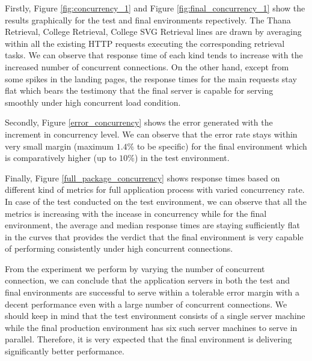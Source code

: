 \documentclass[sigconf,authordraft]{acmart}
\begin{document}
Firstly, Figure \ref{fig:concurrency_1} and Figure \ref{fig:final_concurrency_1} show the results graphically for the test and final environments repectively. The Thana Retrieval, College Retrieval, College SVG Retrieval lines are drawn by averaging within all the existing HTTP requests executing the corresponding retrieval tasks. We can observe that response time of each kind tends to increase with the increased number of concurrent connections. 
On the other hand, except from some spikes in the landing pages, the response times for the main requests stay flat which bears the testimony that the final server is capable for serving smoothly under high concurrent load condition.

Secondly, Figure \ref{error_concurrency} shows the error generated with the increment in concurrency level. We can observe that the error rate stays within very small margin (maximum $1.4\%$ to be specific) for the final environment which is comparatively higher (up to $10\%$) in the test environment.

Finally, Figure \ref{full_package_concurrency} shows response times based on different kind of metrics for full application process with varied concurrency rate. In case of the test conducted on the test environment, we can observe that all the metrics is increasing with the incease in concurrency while for the final environment, the average and median response times are staying sufficiently flat in the curves that provides the verdict that the final environment is very capable of performing consistently under high concurrent connections.   

From the experiment we perform by varying the number of concurrent connection, we can conclude that the application servers in both the test and final environments are successful to serve within a tolerable error margin with a decent performance even with a large number of concurrent connections. We should keep in mind that the test environment consists of a single server machine while the final production environment has six such server machines to serve in parallel. Therefore, it is very expected that the final environment is delivering significantly better performance.
\end{document}
